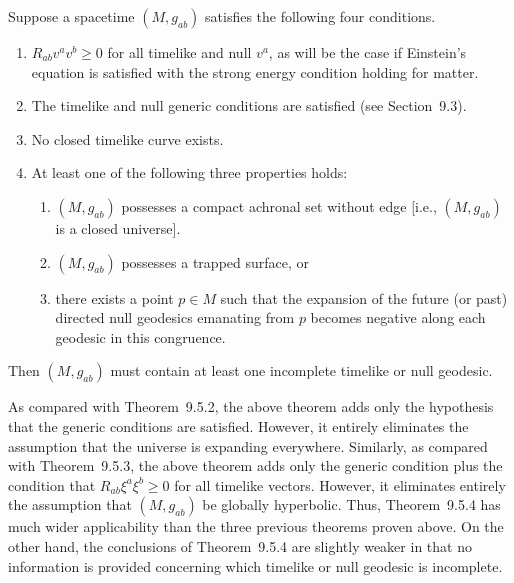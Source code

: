 \begin{theorem}\label{thm:9.5.4}
Suppose a spacetime \((M,g_{ab})\) satisfies the following four conditions.
\begin{enumerate}
  \item \(R_{ab}v^av^b\geq0\) for all timelike and null \(v^a\), as will be the case
  if Einstein's equation is satisfied with the strong energy condition holding for
  matter.
  \item The timelike and null generic conditions are satisfied (see Section~9.3).
  \item No closed timelike curve exists.
  \item At least one of the following three properties holds:
  \begin{enumerate}
    \item \((M,g_{ab})\) possesses a compact achronal set without edge [i.e.,
    \((M,g_{ab})\) is a closed universe].
    \item \((M,g_{ab})\) possesses a trapped surface, or
    \item there exists a point \(p\in M\) such that the expansion of the future (or
    past) directed null geodesics emanating from \(p\) becomes negative along each
    geodesic in this congruence.
  \end{enumerate}
\end{enumerate}
Then \((M,g_{ab})\) must contain at least one incomplete timelike or null geodesic.
\end{theorem}

As compared with Theorem~9.5.2, the above theorem adds only the hypothesis that the
generic conditions are satisfied. However, it entirely eliminates the assumption that
the universe is expanding everywhere. Similarly, as compared with Theorem~9.5.3, the
above theorem adds only the generic condition plus the condition that
\(R_{ab}\xi^a\xi^b\geq0\) for all timelike vectors. However, it eliminates entirely
the assumption that \((M,g_{ab})\) be globally hyperbolic. Thus, Theorem~9.5.4 has
much wider applicability than the three previous theorems proven above. On the other
hand, the conclusions of Theorem~9.5.4 are slightly weaker in that no information is
provided concerning which timelike or null geodesic is incomplete.

